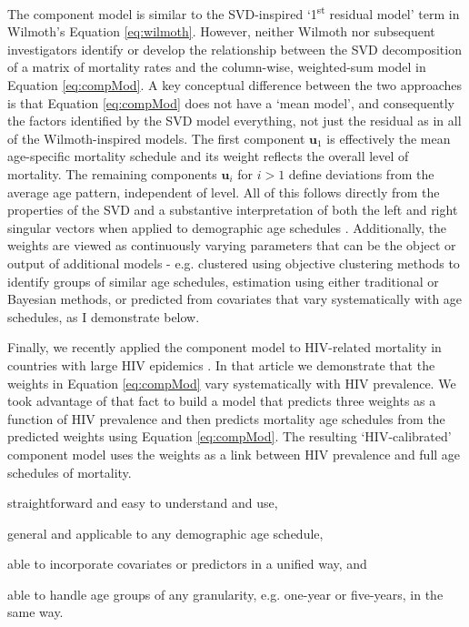 \documentclass[11pt]{article}
\newcommand{\mbf}{\mathbf}
\begin{document}
The component model is similar to the SVD-inspired `1\textsuperscript{st} residual model' term in Wilmoth's Equation \ref{eq:wilmoth}.  However, neither Wilmoth nor subsequent investigators identify or develop the relationship between the SVD decomposition of a matrix of mortality rates and the column-wise, weighted-sum model  in Equation \ref{eq:compMod}.  A key conceptual difference between the two approaches is that Equation \ref{eq:compMod} does not have a `mean model', and consequently the factors identified by the SVD model everything, not just the residual as in all of the Wilmoth-inspired models.  The first component $\mbf{u}_1$ is effectively the mean age-specific mortality schedule and its weight reflects the overall level of mortality.  The remaining components $\mbf{u}_i$ for $i>1$ define deviations from the average age pattern, independent of level.  All of this follows directly from the properties of the SVD and a substantive interpretation of both the left and right singular vectors when applied to demographic age schedules \citep{clark2015singular}. Additionally, the weights are viewed as continuously varying parameters that can be the object or output of additional models - e.g. clustered using objective clustering methods to identify groups of similar age schedules, estimation using either traditional or Bayesian methods, or predicted from covariates that vary systematically with age schedules, as I demonstrate below.

Finally, we recently applied the component model to HIV-related mortality in countries with large HIV epidemics \citep{sharrow2014modeling}. In that article we demonstrate that the weights in Equation \ref{eq:compMod} vary systematically with HIV prevalence.  We took advantage of that fact to build a model that predicts three weights as a function of HIV prevalence and then predicts mortality age schedules from the predicted weights using Equation \ref{eq:compMod}.  The resulting `HIV-calibrated' component model uses the weights as a link between HIV prevalence and full age schedules of mortality.  

\begin{enumerate*}[label=\arabic*)]
\item straightforward and easy to understand and use, 
\item general and applicable to any demographic age schedule, 
\item able to incorporate covariates or predictors in a unified way, and
\item able to handle age groups of any granularity, e.g. one-year or five-years, in the same way.
\end{enumerate*}
\end{document}
